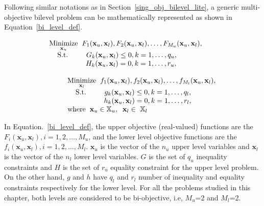 Following similar notations as in Section~\ref{sing_obj_bilevel_lite}, a generic multi-objective bilevel problem can be mathematically represented as shown in Equation~\ref{bi_level_def}.


\begin{equation}
\begin{array}{lr}
 \underset{\mathbf{x}_u}{\text{Minimize}}\hspace{2mm} F_1(\mathbf{x}_u, \mathbf{ x}_l),F_2(\mathbf{x}_u, \mathbf{ x}_l),\dots, F_{M_u}(\mathbf{x}_u, \mathbf{ x}_l), \hspace{2mm} \\ 
 \hspace{4mm}\text{S.t.}\hspace{9mm}G_k(\mathbf{x}_u, \mathbf{ x}_l) \le 0, k=1,\ldots,q_u, \hspace{2mm}\\
\hspace{18mm}H_k(\mathbf{x}_u, \mathbf{ x}_l) = 0, k=1,\ldots,r_u, \hspace{2mm}\\
\text{ }\\
\hspace{9mm} \underset{\mathbf{x}_l}{\text{Minimize}}\hspace{2mm} f_1(\mathbf{x}_u, \mathbf{ x}_l),f_2(\mathbf{x}_u, \mathbf{ x}_l),\ldots,f_{M_l}(\mathbf{x}_u, \mathbf{ x}_l), \\
 \hspace{9mm} \hspace{4mm}\text{S.t.}\hspace{9mm}g_k(\mathbf{x}_u, \mathbf{ x}_l) \le 0, k=1,\ldots,q_l, \hspace{2mm}\\
\hspace{9mm}\hspace{18mm}h_k(\mathbf{x}_u, \mathbf{ x}_l) = 0, k=1,\ldots,r_l, \hspace{1mm}\\
\hspace{9mm} \text {where}\hspace{2mm}{\mathbf{x}_u \in \mathbb{X}_u}, \hspace{2mm}{\mathbf{x}_l \in \ \mathbb{X}_l}\\
\end{array}
\label{bi_level_def}
\end{equation}



In Equation.~\ref{bi_level_def}, the upper objective (real-valued) functions are the $F_i(\mathbf{x}_u, \mathbf{ x}_l), i=1,2,\ldots, M_u$, and the lower level objective functions are the $f_i(\mathbf{x}_u, \mathbf{ x}_l), i=1,2,\ldots,M_l$. $\mathbf{x}_u$ is the vector of the $n_u$ upper level variables and $\mathbf{x}_l$ is the vector of the $n_l$ lower level variables. $G$ is the set of $q_u$ inequality constraints and $H$ is the set of $r_u$ equality constraint for the upper level problem. On the other hand, $g$ and $h$ have $q_l$ and $r_l$ number of inequality and equality constraints respectively for the lower level. For all the problems studied in this chapter, both levels are considered to be bi-objective, i.e, $M_u$=2  and $ M_l$=2.


